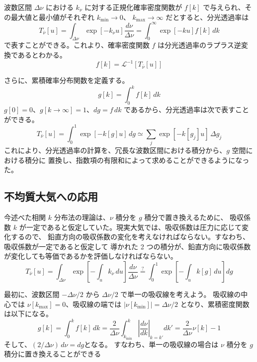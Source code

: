 \documentclass[article,twoside]{dennou777}
\newcommand{\hmeqq}{\stackrel{\mathrm{?}}{=}}
\begin{document}
波数区間 $\Delta\nu$ における $k_\nu$ に対する正規化確率密度関数が
$f[k]$ で与えられ、その最大値と最小値がそれぞれ $k_{\mathrm{min}}\to0$、
$k_{\mathrm{max}}\to\infty$ だとすると、分光透過率は
\begin{equation}
	T_{\bar\nu}[u]=\int_{\Delta\nu}\exp[-k_\nu u]\frac{d\nu}{\Delta\nu}
	=\int^\infty_0 \exp[-ku]f[k]\,dk
\end{equation}
で表すことができる。これより、確率密度関数 $f$ は分光透過率のラプラス逆変換であるとわかる。
\begin{equation}
	f[k]=\mathcal{L}^{-1}[T_{\bar\nu}[u]]
\end{equation}

さらに、累積確率分布関数を定義する。
\begin{equation}
	g[k]=\int^k_0 f[k]\,dk
\end{equation}
$g[0]=0$、$g[k\to\infty]=1$、$dg=f\,dk$ であるから、分光透過率は次で表すことができる。
\begin{equation}
	T_{\bar\nu}[u]=\int^1_0 \exp[-k[g]u]\,dg\simeq\sum_j\exp[-k[g_j]u]\,\Delta g_j
\end{equation}
これにより、分光透過率の計算を、冗長な波数区間における積分から、$g$ 空間における積分に
置換し、指数項の有限和によって求めることができるようになった。

\subsection{不均質大気への応用}
今述べた相関 $k$ 分布法の理論は、$\nu$ 積分を $g$ 積分で置き換えるために、
吸収係数 $k$ が一定であると仮定していた。現実大気では、吸収係数は圧力に応じて変化するので、
鉛直方向の吸収係数の変化を考えなければならない。すなわち、吸収係数が一定であると仮定して
導かれた 2 つの積分が、鉛直方向に吸収係数が変化しても等価であるかを評価しなければならない。
\begin{equation}
	T_{\bar\nu}[u]
	=\int_{\Delta\nu}\exp\left[-\int_u k_\nu\,du\right]\frac{d\nu}{\Delta\nu}
	\hmeqq\int^1_0\exp\left[-\int_uk[g]\,du\right]dg
\end{equation}

最初に、波数区間 $-\Delta\nu/2$ から $\Delta\nu/2$ で単一の吸収線を考えよう。
吸収線の中心では $\nu[k_{\mathrm{max}}]=0$、吸収線の端では
$|\nu[k_{\mathrm{min}}]|=\Delta\nu/2$ となり、累積密度関数は以下になる。
\begin{equation}
	g[k]=\int^k_0 f[k]\,dk
	=\frac{2}{\Delta\nu}\int^k_{k_{\mathrm{min}}}\left|\frac{d\nu}{dk}\right|_{k=k'}dk'
	=\frac{2}{\Delta\nu}\nu[k]-1
\end{equation}
そして、$(2/\Delta\nu)\,d\nu=dg$となる。
すなわち、単一の吸収線の場合は $\nu$ 積分を $g$ 積分に置き換えることができる
\end{document}
